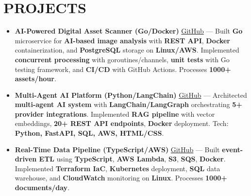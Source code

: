\documentclass[letterpaper,10pt]{article}
\newcommand{\resumeItem}[1]{\item\small #1}
\begin{document}
\section{\textcolor{metablue}{PROJECTS}}
\vspace{-5pt}
\begin{tcolorbox}[colback=white,colframe=metablue,boxrule=0.8pt,arc=2pt,left=4pt,right=4pt,top=2pt,bottom=2pt]
\begin{itemize}
\resumeItem{\textbf{AI-Powered Digital Asset Scanner (Go/Docker)} \href{https://github.com/adityasugandhi}{GitHub} --- Built \textbf{Go} microservice for \textbf{AI-based image analysis} with \textbf{REST API}, \textbf{Docker} containerization, and \textbf{PostgreSQL} storage on \textbf{Linux/AWS}. Implemented \textbf{concurrent processing} with goroutines/channels, \textbf{unit tests} with Go testing framework, and \textbf{CI/CD} with GitHub Actions. Processes \textbf{1000+ assets/hour}.}
\resumeItem{\textbf{Multi-Agent AI Platform (Python/LangChain)} \href{https://github.com/adityasugandhi}{GitHub} --- Architected \textbf{multi-agent AI system} with \textbf{LangChain/LangGraph} orchestrating \textbf{5+ provider integrations}. Implemented \textbf{RAG pipeline} with vector embeddings, \textbf{20+ REST API endpoints}, \textbf{Docker} deployment. Tech: \textbf{Python, FastAPI, SQL, AWS, HTML/CSS}.}
\resumeItem{\textbf{Real-Time Data Pipeline (TypeScript/AWS)} \href{https://github.com/adityasugandhi}{GitHub} --- Built \textbf{event-driven ETL} using \textbf{TypeScript}, \textbf{AWS Lambda}, \textbf{S3}, \textbf{SQS}, \textbf{Docker}. Implemented \textbf{Terraform IaC}, \textbf{Kubernetes} deployment, \textbf{SQL} data warehouse, and \textbf{CloudWatch} monitoring on \textbf{Linux}. Processes \textbf{1000+ documents/day}.}
\end{itemize}
\end{tcolorbox}
\vspace{-5pt}


\end{document}
